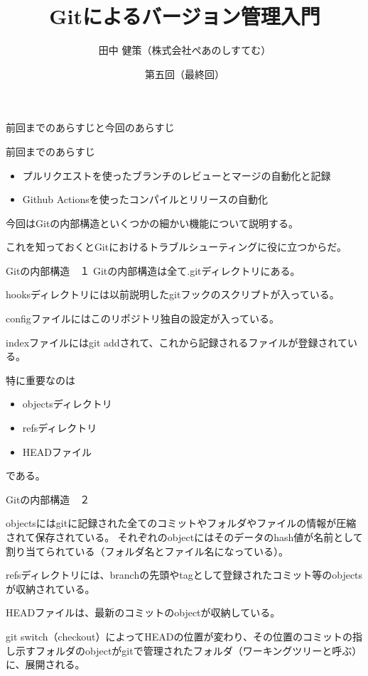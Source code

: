 \documentclass[12pt, unicode]{beamer}
\title{Gitによるバージョン管理入門}
\author{田中 健策（株式会社ぺあのしすてむ）}
\date[2019/10/30]{第五回（最終回）}
\begin{document}
\frame{\maketitle}

\begin{frame}{前回までのあらすじと今回のあらすじ}

前回までのあらすじ
\begin{itemize}
\item プルリクエストを使ったブランチのレビューとマージの自動化と記録
\item Github Actionsを使ったコンパイルとリリースの自動化
\end{itemize}

今回はGitの内部構造といくつかの細かい機能について説明する。

これを知っておくとGitにおけるトラブルシューティングに役に立つからだ。

\end{frame}
\begin{frame}{Gitの内部構造　１}
Gitの内部構造は全て.gitディレクトリにある。

hooksディレクトリには以前説明したgitフックのスクリプトが入っている。

configファイルにはこのリポジトリ独自の設定が入っている。

indexファイルにはgit addされて、これから記録されるファイルが登録されている。

特に重要なのは
\begin{itemize}
\item objectsディレクトリ
\item refsディレクトリ
\item HEADファイル
\end{itemize}
である。

\end{frame}
\begin{frame}{Gitの内部構造　２}

objectsにはgitに記録された全てのコミットやフォルダやファイルの情報が圧縮されて保存されている。
それぞれのobjectにはそのデータのhash値が名前として割り当てられている（フォルダ名とファイル名になっている）。

refsディレクトリには、branchの先頭やtagとして登録されたコミット等のobjectsが収納されている。

HEADファイルは、最新のコミットのobjectが収納している。

git switch（checkout）によってHEADの位置が変わり、その位置のコミットの指し示すフォルダのobjectがgitで管理されたフォルダ（ワーキングツリーと呼ぶ）に、展開される。

\end{frame}
\end{document}
